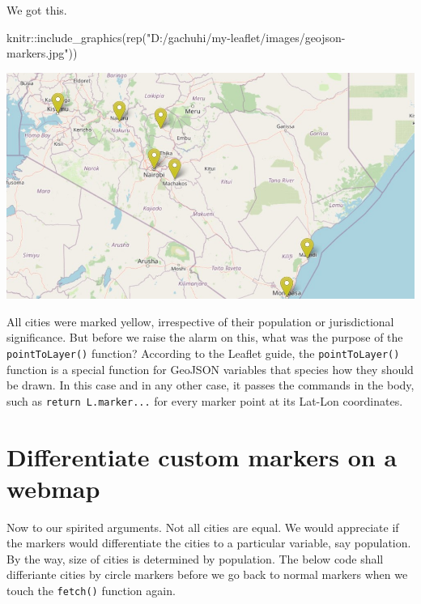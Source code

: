 \documentclass[
]{book}
\newenvironment{Shaded}{\begin{snugshade}}{\end{snugshade}}
\newcommand{\FunctionTok}[1]{\textcolor[rgb]{0.00,0.00,0.00}{#1}}
\newcommand{\NormalTok}[1]{#1}
\newcommand{\SpecialCharTok}[1]{\textcolor[rgb]{0.00,0.00,0.00}{#1}}
\newcommand{\StringTok}[1]{\textcolor[rgb]{0.31,0.60,0.02}{#1}}
\begin{document}
We got this.

\begin{Shaded}
\begin{Highlighting}[]
\NormalTok{knitr}\SpecialCharTok{::}\FunctionTok{include\_graphics}\NormalTok{(}\FunctionTok{rep}\NormalTok{(}\StringTok{"D:/gachuhi/my{-}leaflet/images/geojson{-}markers.jpg"}\NormalTok{))}
\end{Highlighting}
\end{Shaded}

\includegraphics[width=13.83in]{../images/geojson-markers}

All cities were marked yellow, irrespective of their population or jurisdictional significance. But before we raise the alarm on this, what was the purpose of the \texttt{pointToLayer()} function? According to the Leaflet guide, the \texttt{pointToLayer()} function is a special function for GeoJSON variables that species how they should be drawn. In this case and in any other case, it passes the commands in the body, such as \texttt{return\ L.marker...} for every marker point at its Lat-Lon coordinates.

\hypertarget{differentiate-custom-markers-on-a-webmap}{%
\section{Differentiate custom markers on a webmap}\label{differentiate-custom-markers-on-a-webmap}}

Now to our spirited arguments. Not all cities are equal. We would appreciate if the markers would differentiate the cities to a particular variable, say population. By the way, size of cities is determined by population. The below code shall differiante cities by circle markers before we go back to normal markers when we touch the \texttt{fetch()} function again.
\end{document}
